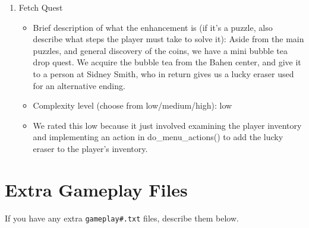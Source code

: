 \documentclass[11pt]{article}
\begin{document}
\begin{enumerate}
\item Fetch Quest
	\begin{itemize}
	\item Brief description of what the enhancement is (if it's a puzzle, also describe what steps the player must take to solve it): Aside from the main puzzles, and general discovery of the coins, we have a mini bubble tea drop quest. We acquire the bubble tea from the Bahen center, and give it to a person at Sidney Smith, who in return gives us a lucky eraser used for an alternative ending.
	\item Complexity level (choose from low/medium/high): low
	\item  We rated this low because it just involved examining the player inventory and implementing an action in do\_menu\_actions() to add the lucky eraser to the player's inventory.
	\end{itemize}
 


\end{enumerate}


\section*{Extra Gameplay Files}

If you have any extra \texttt{gameplay\#.txt} files, describe them below.
\end{document}
